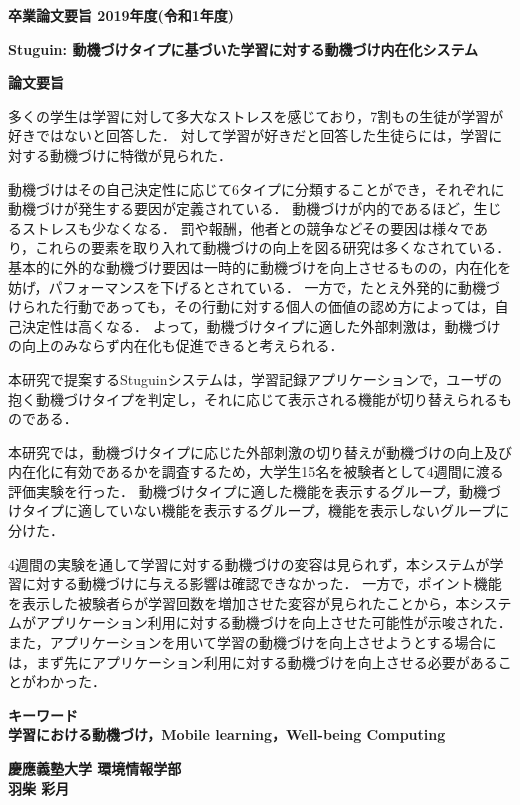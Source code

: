 \begin{center}
\textbf{\Large 卒業論文要旨 2019年度(令和1年度)}

\vspace{6.18mm}

\textbf{\Large Stuguin: 動機づけタイプに基づいた学習に対する動機づけ内在化システム}
\end{center}

\vspace{10mm}

\begin{flushleft}
\textbf{論文要旨}\\
\end{flushleft}

多くの学生は学習に対して多大なストレスを感じており，7割もの生徒が学習が好きではないと回答した．
対して学習が好きだと回答した生徒らには，学習に対する動機づけに特徴が見られた．

動機づけはその自己決定性に応じて6タイプに分類することができ，それぞれに動機づけが発生する要因が定義されている．
動機づけが内的であるほど，生じるストレスも少なくなる．
罰や報酬，他者との競争などその要因は様々であり，これらの要素を取り入れて動機づけの向上を図る研究は多くなされている．
基本的に外的な動機づけ要因は一時的に動機づけを向上させるものの，内在化を妨げ，パフォーマンスを下げるとされている．
一方で，たとえ外発的に動機づけられた行動であっても，その行動に対する個人の価値の認め方によっては，自己決定性は高くなる．
よって，動機づけタイプに適した外部刺激は，動機づけの向上のみならず内在化も促進できると考えられる．

本研究で提案するStuguinシステムは，学習記録アプリケーションで，ユーザの抱く動機づけタイプを判定し，それに応じて表示される機能が切り替えられるものである．

本研究では，動機づけタイプに応じた外部刺激の切り替えが動機づけの向上及び内在化に有効であるかを調査するため，大学生15名を被験者として4週間に渡る評価実験を行った．
動機づけタイプに適した機能を表示するグループ，動機づけタイプに適していない機能を表示するグループ，機能を表示しないグループに分けた．

4週間の実験を通して学習に対する動機づけの変容は見られず，本システムが学習に対する動機づけに与える影響は確認できなかった．
一方で，ポイント機能を表示した被験者らが学習回数を増加させた変容が見られたことから，本システムがアプリケーション利用に対する動機づけを向上させた可能性が示唆された．
また，アプリケーションを用いて学習の動機づけを向上させようとする場合には，まず先にアプリケーション利用に対する動機づけを向上させる必要があることがわかった．

\begin{flushleft}
\textbf{キーワード}\\
\textbf{学習における動機づけ，Mobile learning，Well-being Computing}

\end{flushleft}

\begin{flushright}
\textbf{慶應義塾大学 環境情報学部}\\
\textbf{羽柴 彩月}
\end{flushright}
\newpage

